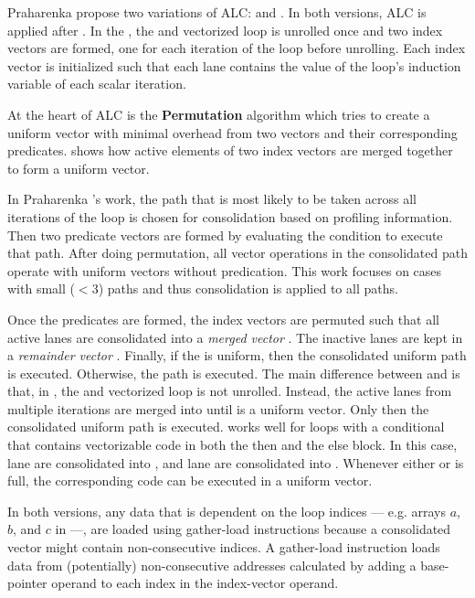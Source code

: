 Praharenka \etal propose two variations of ALC: \unrollALC and \iterALC.
In both versions, ALC is applied after \ifconversion.
In the \unrollALC, the \ifconverted and vectorized loop is unrolled once and two index vectors are formed, one for each iteration of the loop before unrolling.
Each index vector is initialized such that each lane contains the value of the loop's induction variable of each scalar iteration.

At the heart of ALC is the \textbf{Permutation} algorithm which tries to create a uniform vector with minimal overhead from two vectors and their corresponding predicates.  shows how active elements of two index vectors are merged together to form a uniform vector.

In Praharenka \etal's work, the path that is most likely to be taken across all iterations of the loop is chosen for consolidation based on profiling information.
Then two predicate vectors are formed by evaluating the condition to execute that path. After doing permutation, all vector operations in the consolidated path operate with uniform vectors without predication.
This work focuses on cases with small ($< 3$) paths and thus consolidation is applied to all paths.

Once the predicates are formed, the index vectors are permuted such that all active lanes are consolidated into a \emph{merged vector} \vM.
The inactive lanes are kept in a \emph{remainder vector} \vR.
Finally, if the \vM is uniform, then the consolidated uniform path is executed.
Otherwise, the \ifconverted path is executed.
The main difference between \unrollALC and \iterALC is that, in \iterALC, the \ifconverted and vectorized loop is not unrolled.
Instead, the active lanes from multiple iterations are merged into \vM until \vM is a uniform vector. 
Only then the consolidated uniform path is executed.
\iterALC works well for loops with a conditional that contains vectorizable code in both the then and the else block.
In this case,  lane are consolidated into \vM, and  lane are consolidated into \vR.
Whenever either \vM or \vR is full, the corresponding code can be executed in a uniform vector.


In both versions, any data that is dependent on the loop indices --- e.g. arrays $a$, $b$, and $c$ in  ---, are loaded using gather-load instructions because a consolidated vector might contain non-consecutive indices.
A gather-load instruction loads data from (potentially) non-consecutive addresses calculated by adding a base-pointer operand to each index in the index-vector operand.

